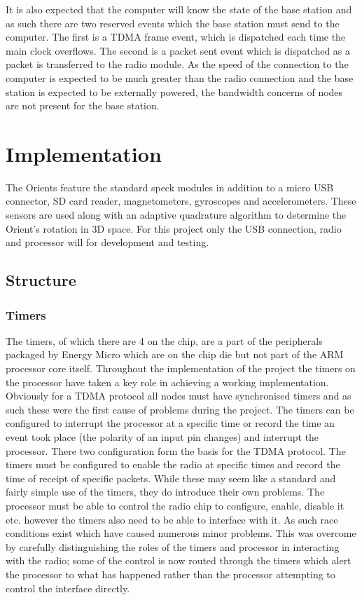 \documentclass[parskip]{cs4rep}
\begin{document}
It is also expected that the computer will know the state of the base station and as such there are two reserved events which the base station must send to the computer. The first is a TDMA frame event, which is dispatched each time the main clock overflows. The second is a packet sent event which is dispatched as a packet is transferred to the radio module. As the speed of the connection to the computer is expected to be much greater than the radio connection and the base station is expected to be externally powered, the bandwidth concerns of nodes are not present for the base station.

\chapter{Implementation}

The Orients feature the standard speck modules in addition to a micro USB connector, SD card reader, magnetometers, gyroscopes and accelerometers. These sensors are used along with an adaptive quadrature algorithm to determine the Orient's rotation in 3D space. For this project only the USB connection, radio and processor will for development and testing. 

\section{Structure}

\subsection{Timers}

The timers, of which there are 4 on the chip, are a part of the peripherals packaged by Energy Micro which are on the chip die but not part of the ARM processor core itself. Throughout the implementation of the project the timers on the processor have taken a key role in achieving a working implementation. Obviously for a TDMA protocol all nodes must have synchronised timers and as such these were the first cause of problems during the project. The timers can be configured to interrupt the processor at a specific time or record the time an event took place (the polarity of an input pin changes) and interrupt the processor. There two configuration form the basis for the TDMA protocol. The timers must be configured to enable the radio at specific times and record the time of receipt of specific packets. While these may seem like a standard and fairly simple use of the timers, they do introduce their own problems. The processor must be able to control the radio chip to configure, enable, disable it etc. however the timers also need to be able to interface with it. As such race conditions exist which have caused numerous minor problems. This was overcome by carefully distinguishing the roles of the timers and processor in interacting with the radio; some of the control is now routed through the timers which alert the processor to what has happened rather than the processor attempting to control the interface directly. 
\end{document}
